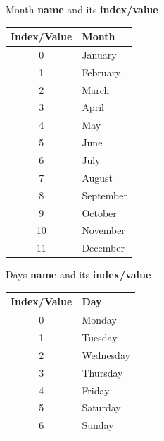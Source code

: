 \documentclass[10pt]{article}
\begin{document}
\begin{multicols}{2}
\begin{center}
Month \textbf{name} and its \textbf{index/value}
\newline
\newline
	\begin{tabular}{|cl|}
		\hline
		\textbf{Index/Value} & \textbf{Month} \\
		\hline
		0 & January \\
		\hline
		1 & February \\
		\hline
		2 & March \\
		\hline
		3 & April \\
		\hline
		4 & May \\
		\hline
		5 & June \\
		\hline
		6 & July \\
		\hline
		7 & August \\
		\hline
		8 & September \\
		\hline
		9 & October \\
		\hline
		10 & November \\
		\hline
		11 & December \\
		\hline
		\hline
	\end{tabular}
\end{center}
\columnbreak
\begin{center}
	Days \textbf{name} and its \textbf{index/value}
\end{center}
\begin{center}
	\begin{tabular}{|cl|}
		\hline
		\textbf{Index/Value} & \textbf{Day} \\
		\hline
		0 & Monday \\
		\hline
		1 & Tuesday \\
		\hline
		2 & Wednesday \\
		\hline
		3 & Thursday \\
		\hline
		4 & Friday \\
		\hline
		5 & Saturday \\
		\hline
		6 & Sunday \\
		\hline
		\hline
	\end{tabular}
\end{center}
\end{multicols}
\end{document}
